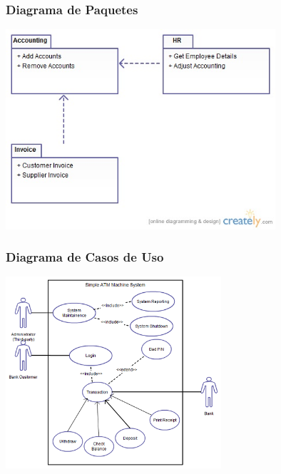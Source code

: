 \begin{frame}
\frametitle{Diagrama de Paquetes}

\begin{center}
\includegraphics[width=10cm]{figs/Package-Diagram-UML.jpeg}
\end{center}  

\end{frame}

\begin{frame}
\frametitle{Diagrama de Casos de Uso}

\begin{center}
\includegraphics[width=8cm]{figs/Use-Case-Diagram.png}
\end{center}
  
\end{frame}

